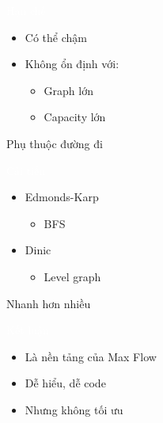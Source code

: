 \documentclass{beamer}
\newcommand{\hlblue}[1]{\textcolor{myblue}{#1}}
\newcommand{\hlgreen}[1]{\textcolor{mygreen}{#1}}
\newcommand{\hlred}[1]{\textcolor{myred}{#1}}
\newcommand{\hlpurple}[1]{\textcolor{mypurple}{#1}}
\newcommand{\hlcyan}[1]{\textcolor{mycyan}{#1}}
\newcommand{\hlwhite}[1]{\textcolor{white}{#1}}
\begin{document}

\begin{frame}{\hlwhite{Hạn chế}}
\begin{itemize}
\item Có thể \hlred{chậm}
\item Không ổn định với:
\begin{itemize}
\item Graph lớn
\item Capacity lớn
\end{itemize}
\end{itemize}

\begin{tcolorbox}
\centering
\hlpurple{Phụ thuộc đường đi}
\end{tcolorbox}
\end{frame}


\begin{frame}{\hlwhite{Cải tiến}}
\begin{itemize}
\item \hlblue{Edmonds-Karp}
\begin{itemize}
\item BFS
\end{itemize}

\item \hlgreen{Dinic}
\begin{itemize}
\item Level graph
\end{itemize}
\end{itemize}

\begin{tcolorbox}
\centering
\hlcyan{Nhanh hơn nhiều}
\end{tcolorbox}
\end{frame}


\begin{frame}{\hlwhite{Kết luận}}
\begin{itemize}
\item Là nền tảng của Max Flow
\item Dễ hiểu, dễ code
\item Nhưng không tối ưu
\end{itemize}
\end{frame}
\end{document}
